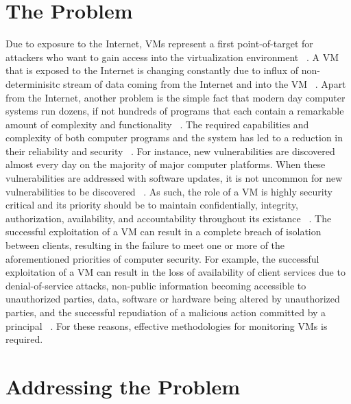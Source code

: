 \documentclass{report}
\begin{document}
\begin{spacing}{1.5}
\section{The Problem}

{\large 
Due to exposure to the Internet, VMs represent a first point-of-target for attackers who want to gain access into the virtualization environment ~\cite{win2014virtual}. A VM that is exposed to the Internet is changing constantly due to influx of non-determinisitc stream of data coming from the Internet and into the VM ~\cite{somayaji2002operating}. Apart from the Internet, another problem is the simple fact that modern day computer systems run dozens, if not hundreds of programs that each contain a remarkable amount of complexity and functionality ~\cite{somayaji2002operating}. The required capabilities and complexity of both computer programs and the system has led to a reduction in their reliability and security ~\cite{somayaji2002operating}. For instance, new vulnerabilities are discovered almost every day on the majority of major computer platforms. When these vulnerabilities are addressed with software updates, it is not uncommon for new vulnerabilities to be discovered ~\cite{somayaji2002operating}. As such, the role of a VM is highly security critical and its priority should be to maintain confidentially, integrity, authorization, availability, and accountability throughout its existance ~\cite{van2021computer}. The successful exploitation of a VM can result in a complete breach of isolation between clients, resulting in the failure to meet one or more of the aforementioned priorities of computer security. For example, the successful exploitation of a VM can result in the loss of availability of client services due to denial-of-service attacks, non-public information becoming accessible to unauthorized parties, data, software or hardware being altered by unauthorized parties, and the successful repudiation of a malicious action committed by a principal ~\cite{van2021computer}. For these reasons, effective methodologies for monitoring VMs is required.
\newline
}

\section{Addressing the Problem}


\end{spacing}
\end{document}
